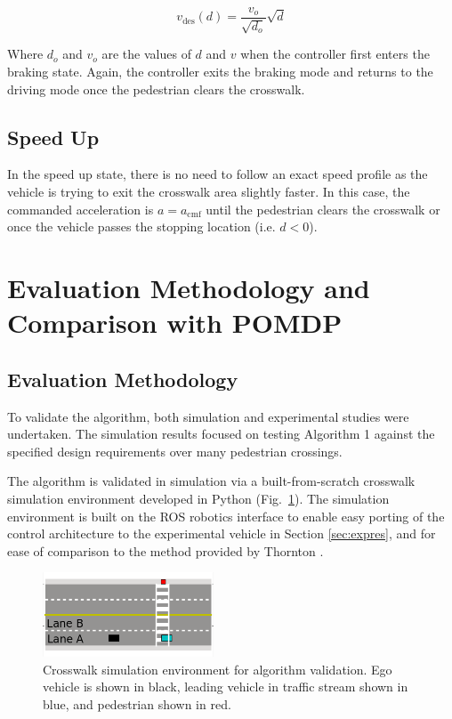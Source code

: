 \documentclass[letterpaper, 10 pt, conference]{ieeeconf} %
\begin{document}
\begin{equation}
v_\mathrm{des}(d) = \frac{v_o}{\sqrt{d_o}}\sqrt{d}
\end{equation}   

Where $d_o$ and $v_o$ are the values of $d$ and $v$ when the controller first enters the braking state. Again, the controller exits the braking mode and returns to the driving mode once the pedestrian clears the crosswalk. 

\subsection{Speed Up}

In the speed up state, there is no need to follow an exact speed profile as the vehicle is trying to exit the crosswalk area slightly faster. In this case, the commanded acceleration is $a = a_\mathrm{cmf}$ until the pedestrian clears the crosswalk or once the vehicle passes the stopping location (i.e. $d< 0$). 

\section{Evaluation Methodology and Comparison with POMDP}

\subsection{Evaluation Methodology}

To validate the algorithm, both simulation and experimental studies were undertaken. The simulation results focused on testing Algorithm 1 against the specified design requirements over many pedestrian crossings. 

The algorithm is validated in simulation via a built-from-scratch crosswalk simulation environment developed in Python (Fig.~\ref{fig:simFramework}). The simulation environment is built on the ROS robotics interface to enable easy porting of the control architecture to the experimental vehicle in Section \ref{sec:expres}, and for ease of comparison to the method provided by Thornton \cite{Thornton2018}.  

\begin{figure}
\centering
\includegraphics[width=2.0in]{figures/simFramework.png}
\caption{Crosswalk simulation environment for algorithm validation. Ego vehicle is shown in black, leading vehicle in traffic stream shown in blue, and pedestrian shown in red.}
\label{fig:simFramework}
\end{figure}
\end{document}
